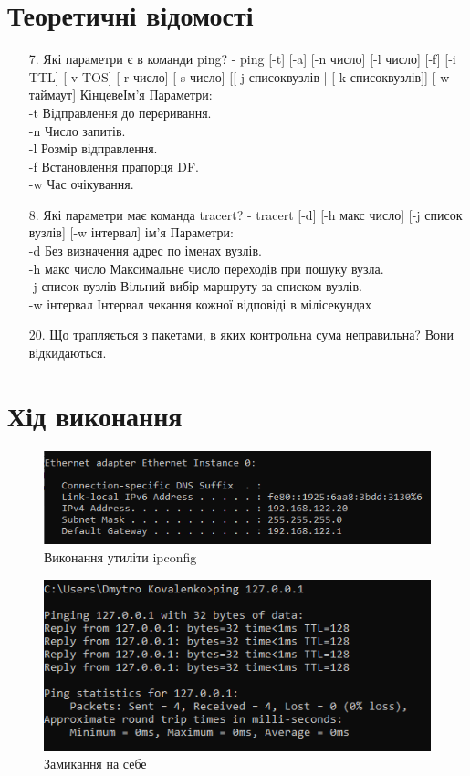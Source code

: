 \documentclass{article}
\begin{document}
\begin{normalsize}
\section*{Теоретичні відомості}
\begin{enumerate}
	\item[7.] Які параметри є в команди ping? - ping [-t] [-a] [-n число] [-l число] [-f] [-i TTL] [-v TOS] [-r число] [-s число] [[-j
	списоквузлів | [-k списоквузлів]] [-w таймаут] КінцевеІм’я
	Параметри:\\
	-t Відправлення до переривання.\\
	-n Число запитів.\\
	-l Розмір відправлення.\\
	-f Встановлення прапорця DF.\\
	-w Час очікування.
	\item[8.] Які параметри має команда tracert? - tracert [-d] [-h макс число] [-j список вузлів] [-w інтервал] ім'я
	Параметри:\\
	-d Без визначення адрес по іменах вузлів.\\
	-h макс число Максимальне число переходів при пошуку вузла.\\
	-j список вузлів Вільний вибір маршруту за списком вузлів.\\
	-w інтервал Інтервал чекання кожної відповіді в мілісекундах
	\item[20.] Що трапляється з пакетами, в яких контрольна сума неправильна?
	Вони відкидаються.
\end{enumerate}

\section*{Хід виконання}
\begin{figure}[H]
	\centering
	\includegraphics[scale=0.8]{ic}
	\caption{Виконання утиліти ipconfig}
\end{figure}

\begin{figure}[H]
	\centering
	\includegraphics[scale=0.8]{pl}
	\caption{Замикання на себе}
\end{figure}


\end{normalsize}
\end{document}

